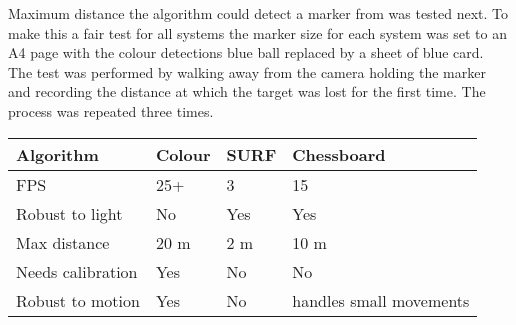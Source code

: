 Maximum distance the algorithm could detect a marker from was tested next. To make this a fair test for all systems the marker size for each system was set to an A4 page with the colour detections blue ball replaced by a sheet of blue card. The test was performed by walking away from the camera holding the marker and recording the distance at which the target was lost for the first time. The process was repeated three times.  
\begin{center}
    \begin{tabular}{ | l | l | l | p{2.5cm} |}
    \hline
    Algorithm & Colour & SURF & Chessboard \\ \hline
	FPS & 25+ & 3 & 15 \\ \hline
	Robust to light & No & Yes & Yes \\ \hline
	Max distance & 20 m & 2 m & 10 m \\ \hline
	Needs calibration & Yes & No & No \\ \hline
	Robust to motion & Yes & No & handles small movements \\ \hline
    \end{tabular}
\end{center}